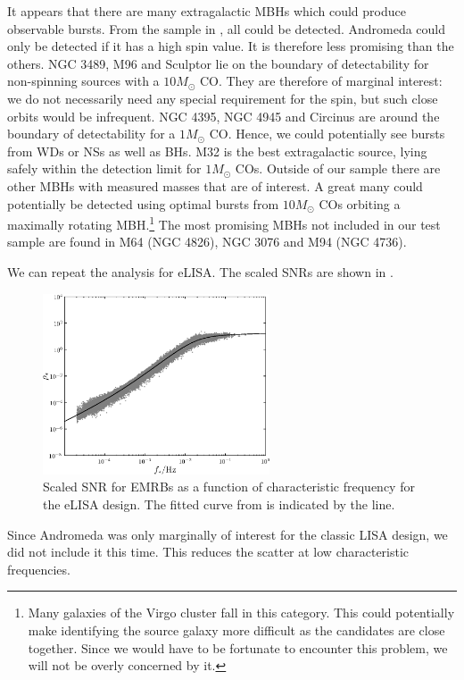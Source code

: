 It appears that there are many extragalactic MBHs which could produce observable bursts. From the sample in , all could be detected. Andromeda could only be detected if it has a high spin value. It is therefore less promising than the others. NGC 3489, M96 and Sculptor lie on the boundary of detectability for non-spinning sources with a $10 M_\odot$ CO. They are therefore of marginal interest: we do not necessarily need any special requirement for the spin, but such close orbits would be infrequent. NGC 4395, NGC 4945 and Circinus are around the boundary of detectability for a $1 M_\odot$ CO. Hence, we could potentially see bursts from WDs or NSs as well as BHs. M32 is the best extragalactic source, lying safely within the detection limit for $1 M_\odot$ COs. Outside of our sample there are other MBHs with measured masses that are of interest. A great many could potentially be detected using optimal bursts from $10 M_\odot$ COs orbiting a maximally rotating MBH.\footnote{Many galaxies of the Virgo cluster fall in this category. This could potentially make identifying the source galaxy more difficult as the candidates are close together. Since we would have to be fortunate to encounter this problem, we will not be overly concerned by it.} The most promising MBHs not included in our test sample are found in M64 (NGC 4826), NGC 3076 and M94 (NGC 4736).

We can repeat the analysis for eLISA. The scaled SNRs are shown in . 
\begin{figure}
\centering
 \includegraphics[width=0.6\textwidth]{./images/Fig_SNR_scaled_fit_eLISA}
 \caption{Scaled SNR for EMRBs as a function of characteristic frequency for the eLISA design. The fitted curve from  is indicated by the line.}
\label{fig:scaled-SNR-eLISA}
\end{figure}
Since Andromeda was only marginally of interest for the classic LISA design, we did not include it this time. This reduces the scatter at low characteristic frequencies.

